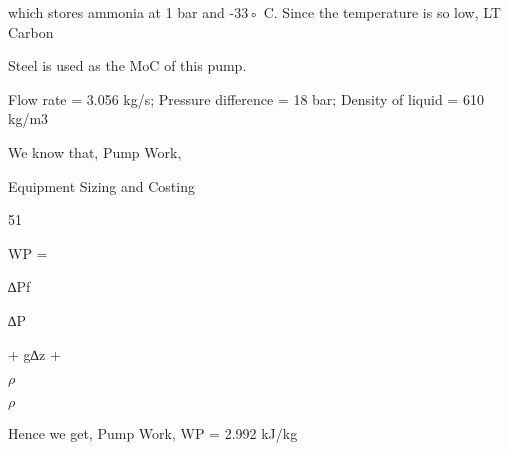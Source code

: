 \documentclass[a4paper,portrait,12pt]{article}
\begin{document}
\begin{flushleft}
which stores ammonia at 1 bar and -33◦ C. Since the temperature is so low, LT Carbon
\end{flushleft}


\begin{flushleft}
Steel is used as the MoC of this pump.
\end{flushleft}


\begin{flushleft}
Flow rate = 3.056 kg/s; Pressure difference = 18 bar; Density of liquid = 610 kg/m3
\end{flushleft}


\begin{flushleft}
We know that, Pump Work,
\end{flushleft}





\begin{flushleft}
\newpage
Equipment Sizing and Costing
\end{flushleft}





51





\begin{flushleft}
WP =
\end{flushleft}





\begin{flushleft}
∆Pf
\end{flushleft}


\begin{flushleft}
∆P
\end{flushleft}


\begin{flushleft}
+ g∆z +
\end{flushleft}


\begin{flushleft}
$\rho$
\end{flushleft}


\begin{flushleft}
$\rho$
\end{flushleft}





\begin{flushleft}
Hence we get, Pump Work, WP = 2.992 kJ/kg
\end{flushleft}
\end{document}
